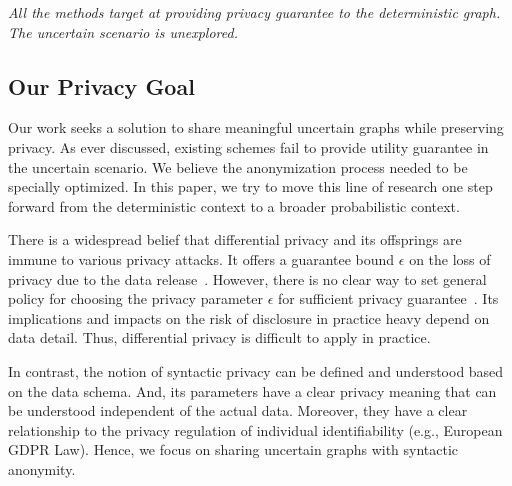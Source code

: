 \emph{All the methods target at providing privacy guarantee to the deterministic graph. The uncertain scenario is unexplored.}

\vspace{-4pt}
\subsection{Our Privacy Goal}
Our work seeks a solution to share meaningful uncertain graphs while preserving privacy.
As ever discussed, existing schemes fail to provide utility guarantee in the uncertain scenario. 
We believe the anonymization process needed to be specially optimized. 
In this paper, we try to move this line of research one step forward from the deterministic context to a broader probabilistic context.

There is a widespread belief that differential privacy and its offsprings are immune to various privacy attacks. It offers a guarantee bound $\epsilon$ on the loss of privacy due to the data release~\cite{Sala_Sharing_2011,Xiao_Differentially_2014}. However, there is no clear way to set general policy for choosing the privacy parameter $\epsilon$ for sufficient privacy guarantee~\cite{lee2011}. Its implications and impacts on the risk of disclosure in practice heavy depend on data detail. Thus, differential privacy is difficult to apply in practice. 

In contrast, the notion of syntactic privacy can be defined and understood based on the data schema. And, its parameters have a clear privacy meaning that can be understood independent of the actual data. Moreover, they have a clear relationship to the privacy regulation of individual identifiability (e.g., European GDPR Law). 
Hence, we focus on sharing uncertain graphs with syntactic anonymity. 



